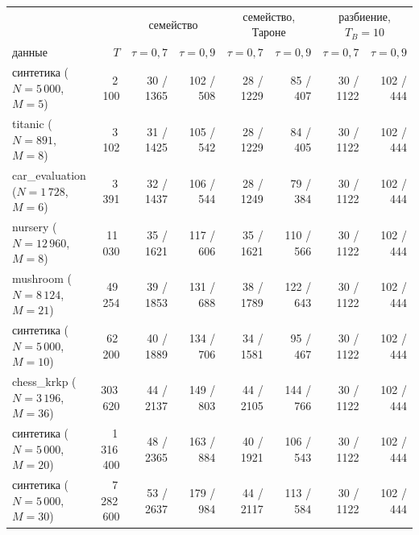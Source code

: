 \begin{tabular}{lrrrrrrr}
\toprule
& & \multicolumn{2}{c}{семейство} & \multicolumn{2}{c}{семейство, Тароне} & \multicolumn{2}{c}{разбиение, $T_B=10$}\\
данные & $T$ & $\tau=0{,}7$ & $\tau=0{,}9$ & $\tau=0{,}7$ & $\tau=0{,}9$ & $\tau=0{,}7$ & $\tau=0{,}9$\\
\midrule
синтетика ($N=5\,000$, $M=5$) & 2\,100 & 30 / 1365 & 102 / 508 & 28 / 1229 & 85 / 407 & 30 / 1122 & 102 / 444\\
titanic ($N=891$, $M=8$) & 3\,102 & 31 / 1425 & 105 / 542 & 28 / 1229 & 84 / 405 & 30 / 1122 & 102 / 444\\
car\_evaluation ($N=1\,728$, $M=6$) & 3\,391 & 32 / 1437 & 106 / 544 & 28 / 1249 & 79 / 384 & 30 / 1122 & 102 / 444\\
nursery ($N=12\,960$, $M=8$) & 11\,030 & 35 / 1621 & 117 / 606 & 35 / 1621 & 110 / 566 & 30 / 1122 & 102 / 444\\
mushroom ($N=8\,124$, $M=21$) & 49\,254 & 39 / 1853 & 131 / 688 & 38 / 1789 & 122 / 643 & 30 / 1122 & 102 / 444\\
синтетика ($N=5\,000$, $M=10$) & 62\,200 & 40 / 1889 & 134 / 706 & 34 / 1581 & 95 / 467 & 30 / 1122 & 102 / 444\\
chess\_krkp ($N=3\,196$, $M=36$) & 303\,620 & 44 / 2137 & 149 / 803 & 44 / 2105 & 144 / 766 & 30 / 1122 & 102 / 444\\
синтетика ($N=5\,000$, $M=20$) & 1\,316\,400 & 48 / 2365 & 163 / 884 & 40 / 1921 & 106 / 543 & 30 / 1122 & 102 / 444\\
синтетика ($N=5\,000$, $M=30$) & 7\,282\,600 & 53 / 2637 & 179 / 984 & 44 / 2117 & 113 / 584 & 30 / 1122 & 102 / 444\\
\bottomrule
\end{tabular}

